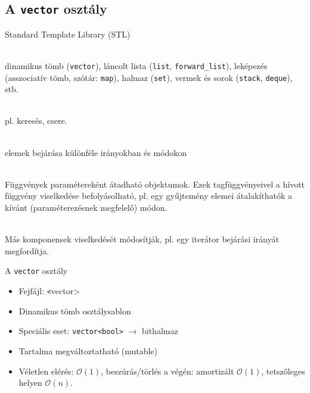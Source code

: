 \subsection{A \texttt{vector} osztály}

\begin{frame}
    Standard Template Library (STL)
    \small
    \begin{description}[m]
        \item[Gyűjtemények (containers)] \hfill \\ dinamikus tömb (\texttt{vector}), láncolt lista (\texttt{list}, \texttt{forward\_list}), leképezés (asszociatív tömb, szótár: \texttt{map}), halmaz (\texttt{set}), vermek és sorok (\texttt{stack}, \texttt{deque}), stb.
        \item[Algoritmusok] \hfill \\ pl. keresés, csere. 
        \item[Iterátorok] \hfill \\ elemek bejárása különféle irányokban és módokon
        \item[\emph{Függvény objektumok} (functors)] \hfill \\ Függvények paramétereként átadható objektumok. Ezek tagfüggvényeivel a hívott függvény viselkedése befolyásolható, pl. egy gyűjtemény elemei átalakíthatók a kívánt (paraméterezésnek megfelelő) módon.
        \item[\emph{Adapterek} (adapters)] \hfill \\ Más komponensek viselkedését módosítják, pl. egy iterátor bejárási irányát megfordítja. 
    \end{description}
\end{frame}

\begin{frame}
    A \texttt{vector} osztály
    \begin{itemize}
        \item Fejfájl: \texttt<vector>
        \item Dinamikus tömb osztálysablon
        \item Speciális eset: \texttt{vector<bool>} $\to$ bithalmaz
        \item Tartalma megváltoztatható (mutable)
        \item Véletlen elérés: $\mathcal{O}(1)$, beszúrás/törlés a végén: amortizált $\mathcal{O}(1)$, tetszőleges helyen $\mathcal{O}(n)$.
    \end{itemize}
\end{frame}

